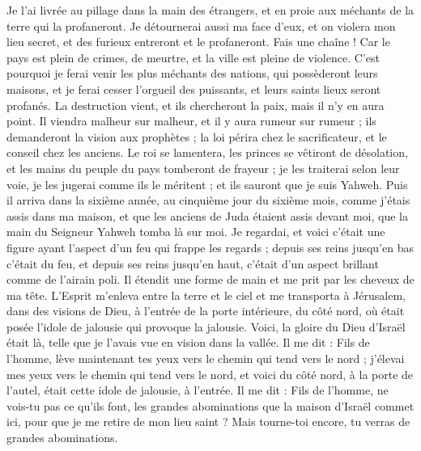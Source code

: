 \begin{multicols}{2}
Je l'ai livrée au pillage dans la main des étrangers, et en proie aux méchants de la terre qui la profaneront.
Je détournerai aussi ma face d'eux, et on violera mon lieu secret, et des furieux entreront et le profaneront.
Fais une chaîne ! Car le pays est plein de crimes, de meurtre, et la ville est pleine de violence.
C'est pourquoi je ferai venir les plus méchants des nations, qui possèderont leurs maisons, et je ferai cesser l'orgueil des puissants, et leurs saints lieux seront profanés.
La destruction vient, et ils chercheront la paix, mais il n'y en aura point.
Il viendra malheur sur malheur, et il y aura rumeur sur rumeur ; ils demanderont la vision aux prophètes ; la loi périra chez le sacrificateur, et le conseil chez les anciens.
Le roi se lamentera, les princes se vêtiront de désolation, et les mains du peuple du pays tomberont de frayeur ; je les traiterai selon leur voie, je les jugerai comme ils le méritent ; et ils sauront que je suis Yahweh.
\VerseOne{}Puis il arriva dans la sixième année, au cinquième jour du sixième mois, comme j'étais assis dans ma maison, et que les anciens de Juda étaient assis devant moi, que la main du Seigneur Yahweh tomba là sur moi.
Je regardai, et voici c’était une figure ayant l’aspect d’un feu qui frappe les regards ; depuis ses reins jusqu'en bas c'était du feu, et depuis ses reins jusqu'en haut, c'était d’un aspect brillant comme de l’airain poli.
Il étendit une forme de main et me prit par les cheveux de ma tête. L'Esprit m'enleva entre la terre et le ciel et me transporta à Jérusalem, dans des visions de Dieu, à l'entrée de la porte intérieure, du côté nord, où était posée l'idole de jalousie  qui provoque la jalousie.
Voici, la gloire du Dieu d'Israël était là, telle que je l’avais vue en vision dans la vallée.
Il me dit : Fils de l’homme, lève maintenant tes yeux vers le chemin qui tend vers le nord ; j'élevai mes yeux vers le chemin qui tend vers le nord, et voici du côté nord, à la porte de l'autel, était cette idole de jalousie, à l'entrée.
Il me dit : Fils de l’homme, ne vois-tu pas ce qu’ils font, les grandes abominations que la maison d'Israël commet ici, pour que je me retire de mon lieu saint ? Mais tourne-toi encore, tu verras de grandes abominations.

\end{multicols}
